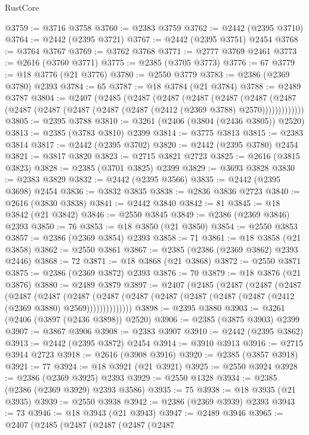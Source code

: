 \begin{lexlean}{RustCore}
\begin{coremodule}
@3759 := @3716 @3758
@3760 := @2383 @3759
@3762 := @2442 (@2395 @3710)
@3764 := @2442 (@2395 @3721)
@3767 := @2442 (@2395 @3751) @2454
@3768 := @3764 @3767
@3769 := @3762 @3768
@3771 := @2777 @3769 @2461
@3773 := @2616 (@3760 @3771)
@3775 := @2385 (@3705 @3773)
@3776 := 67
@3779 := @18 @3776 (@21 @3776)
@3780 := @2550 @3779
@3783 := @2386 (@2369 @3780) @2393
@3784 := 65
@3787 := @18 @3784 (@21 @3784)
@3788 := @2489 @3787
@3804 := @2407
    (@2485
      (@2487
        (@2487
          (@2487
            (@2487
              (@2487
                (@2487 (@2487 (@2487 (@2487 (@2487 (@2487 (@2412 (@2369 @3788) @2570)))))))))))))
@3805 := @2395 @3788
@3810 := @3261 (@2406 (@3804 (@2436 @3805)) @2520)
@3813 := @2385 (@3783 @3810) @2399
@3814 := @3775 @3813
@3815 := @2383 @3814
@3817 := @2442 (@2395 @3702)
@3820 := @2442 (@2395 @3780) @2454
@3821 := @3817 @3820
@3823 := @2715 @3821 @2723
@3825 := @2616 (@3815 @3823)
@3828 := @2385 (@3701 @3825) @2399
@3829 := @3693 @3828
@3830 := @2383 @3829
@3832 := @2442 (@2395 @3566)
@3835 := @2442 (@2395 @3698) @2454
@3836 := @3832 @3835
@3838 := @2836 @3836 @2723
@3840 := @2616 (@3830 @3838)
@3841 := @2442 @3840
@3842 := 81
@3845 := @18 @3842 (@21 @3842)
@3846 := @2550 @3845
@3849 := @2386 (@2369 @3846) @2393
@3850 := 76
@3853 := @18 @3850 (@21 @3850)
@3854 := @2550 @3853
@3857 := @2386 (@2369 @3854) @2393
@3858 := 71
@3861 := @18 @3858 (@21 @3858)
@3862 := @2550 @3861
@3867 := @2385 (@2386 (@2369 @3862) @2393 @2446)
@3868 := 72
@3871 := @18 @3868 (@21 @3868)
@3872 := @2550 @3871
@3875 := @2386 (@2369 @3872) @2393
@3876 := 70
@3879 := @18 @3876 (@21 @3876)
@3880 := @2489 @3879
@3897 := @2407
    (@2485
      (@2487
        (@2487
          (@2487
            (@2487
              (@2487
                (@2487
                  (@2487 (@2487 (@2487 (@2487 (@2487 (@2487 (@2412 (@2369 @3880) @2569))))))))))))))
@3898 := @2395 @3880
@3903 := @3261 (@2406 (@3897 (@2436 @3898)) @2520)
@3906 := @2385 (@3875 @3903) @2399
@3907 := @3867 @3906
@3908 := @2383 @3907
@3910 := @2442 (@2395 @3862)
@3913 := @2442 (@2395 @3872) @2454
@3914 := @3910 @3913
@3916 := @2715 @3914 @2723
@3918 := @2616 (@3908 @3916)
@3920 := @2385 (@3857 @3918)
@3921 := 77
@3924 := @18 @3921 (@21 @3921)
@3925 := @2550 @3924
@3928 := @2386 (@2369 @3925) @2393
@3929 := @2550 @1328
@3934 := @2385 (@2386 (@2369 @3929) @2393 @3586)
@3935 := 75
@3938 := @18 @3935 (@21 @3935)
@3939 := @2550 @3938
@3942 := @2386 (@2369 @3939) @2393
@3943 := 73
@3946 := @18 @3943 (@21 @3943)
@3947 := @2489 @3946
@3965 := @2407
    (@2485
      (@2487
        (@2487
          (@2487
            (@2487

\end{coremodule}
\end{lexlean}
